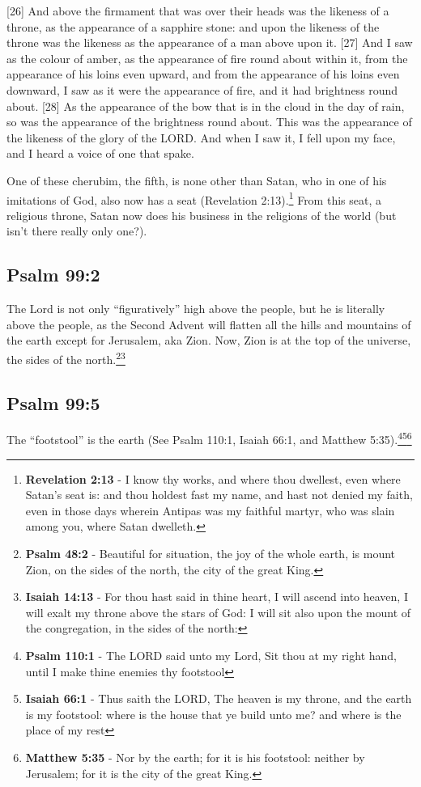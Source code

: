 {[26] And above the firmament that was over their heads was the likeness of a throne, as the appearance of a sapphire stone: and upon the likeness of the throne was the likeness as the appearance of a man above upon it. [27] And I saw as the colour of amber, as the appearance of fire round about within it, from the appearance of his loins even upward, and from the appearance of his loins even downward, I saw as it were the appearance of fire, and it had brightness round about. [28] As the appearance of the bow that is in the cloud in the day of rain, so was the appearance of the brightness round about. This was the appearance of the likeness of the glory of the LORD. And when I saw it, I fell upon my face, and I heard a voice of one that spake.}

One of these cherubim, the fifth, is none other than Satan, who in one of his imitations of God, also now has a seat (Revelation 2:13).\footnote{\textbf{Revelation 2:13} - I know thy works, and where thou dwellest, even where Satan’s seat is: and thou holdest fast my name, and hast not denied my faith, even in those days wherein Antipas was my faithful martyr, who was slain among you, where Satan dwelleth.} From this seat, a religious throne, Satan now does his business in the religions of the world (but isn't there really only one?).

\subsection{Psalm 99:2}
The Lord is not only ``figuratively'' high above the people, but he is literally above the people, as the Second Advent will flatten all the hills and mountains of the earth except for Jerusalem, aka Zion. Now, Zion is at the top of the universe, the sides of the north.\footnote{\textbf{Psalm 48:2} - Beautiful for situation, the joy of the whole earth, is mount Zion, on the sides of the north, the city of the great King.}\footnote{\textbf{Isaiah 14:13} - For thou hast said in thine heart, I will ascend into heaven, I will exalt my throne above the stars of God: I will sit also upon the mount of the congregation, in the sides of the north:}

\subsection{Psalm 99:5}
The ``footstool'' is the earth (See Psalm 110:1, Isaiah 66:1, and Matthew 5:35).\footnote{\textbf{Psalm 110:1} - The LORD said unto my Lord, Sit thou at my right hand, until I make thine enemies thy footstool}\footnote{\textbf{Isaiah 66:1} - Thus saith the LORD, The heaven is my throne, and the earth is my footstool: where is the house that ye build unto me? and where is the place of my rest}\footnote{\textbf{Matthew 5:35} - Nor by the earth; for it is his footstool: neither by Jerusalem; for it is the city of the great King.}

